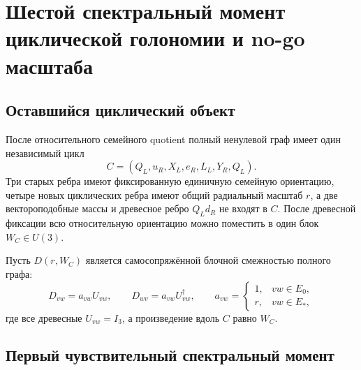 \chapter{Шестой спектральный момент циклической голономии и no-go масштаба}
\label{ch:v7-cycle-holonomy-spectral-moment-scale-gate}

\section{Оставшийся циклический объект}

После относительного семейного quotient полный ненулевой граф имеет один
независимый цикл
\begin{equation}
 C=(Q_L,u_R,X_L,e_R,L_L,Y_R,Q_L).
 \label{eq:v7-cycle-moment-cycle}
\end{equation}
Три старых ребра имеют фиксированную единичную семейную ориентацию, четыре
новых циклических ребра имеют общий радиальный масштаб $r$, а две
вектороподобные массы и древесное ребро $Q_Ld_R$ не входят в $C$.
После древесной фиксации всю относительную ориентацию можно поместить в один
блок $W_C\in U(3)$.

Пусть $D(r,W_C)$ является самосопряжённой блочной смежностью полного графа:
\begin{equation}
 D_{vw}=a_{vw}U_{vw},\qquad
 D_{wv}=a_{vw}U_{vw}^\dagger,\qquad
 a_{vw}=\begin{cases}1,&vw\in E_0,\\r,&vw\in E_*,\end{cases}
 \label{eq:v7-cycle-moment-dirac}
\end{equation}
где все древесные $U_{vw}=I_3$, а произведение вдоль $C$ равно $W_C$.

\section{Первый чувствительный спектральный момент}

